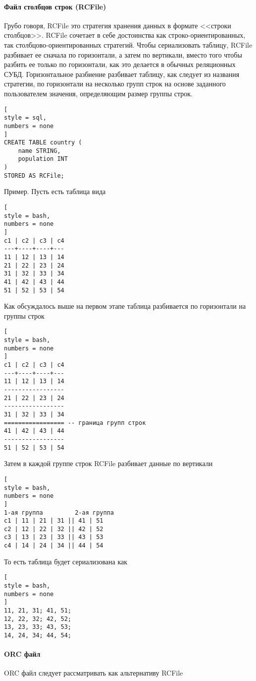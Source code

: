 \documentclass[%
	11pt,
	a4paper,
	utf8,
		]{article}
\begin{document}
\paragraph{Файл столбцов строк (RCFile)} Грубо говоря, RCFile это стратегия хранения данных в формате <<строки столбцов>>. RCFile сочетает в себе достоинства как строко-ориентированных, так столбцово-ориентированных стратегий. Чтобы сериализовать таблицу, RCFile разбивает ее сначала по горизонтали, а затем по вертикали, вместо того чтобы разбить ее только по горизонтали, как это делается в обычных реляционных СУБД. Горизонтальное разбиение разбивает таблицу, как следует из названия стратегии, по горизонтали на несколько групп строк на основе заданного пользователем значения, определяющим размер группы строк.
\begin{lstlisting}[
style = sql,
numbers = none	
]
CREATE TABLE country (
	name STRING,
	population INT
)
STORED AS RCFile;
\end{lstlisting}

Пример. Пусть есть таблица вида
\begin{lstlisting}[
style = bash,
numbers = none	
]
c1 | c2 | c3 | c4
---+----+----+---
11 | 12 | 13 | 14
21 | 22 | 23 | 24
31 | 32 | 33 | 34
41 | 42 | 43 | 44
51 | 52 | 53 | 54
\end{lstlisting}

Как обсуждалось выше на первом этапе таблица разбивается по горизонтали на группы строк
\begin{lstlisting}[
style = bash,
numbers = none	
]
c1 | c2 | c3 | c4
---+----+----+---
11 | 12 | 13 | 14
-----------------
21 | 22 | 23 | 24
-----------------
31 | 32 | 33 | 34
================= -- граница групп строк
41 | 42 | 43 | 44
-----------------
51 | 52 | 53 | 54
\end{lstlisting}

Затем в каждой группе строк RCFile разбивает данные по вертикали
\begin{lstlisting}[
style = bash,
numbers = none	
]
1-ая группа         2-ая группа
с1 | 11 | 21 | 31 || 41 | 51
c2 | 12 | 22 | 32 || 42 | 52
c3 | 13 | 23 | 33 || 43 | 53
c4 | 14 | 24 | 34 || 44 | 54
\end{lstlisting}

То есть таблица будет сериализована как
\begin{lstlisting}[
style = bash,
numbers = none	
]
11, 21, 31; 41, 51;
12, 22, 32; 42, 52;
13, 23, 33; 43, 53;
14, 24, 34; 44, 54;
\end{lstlisting}

\paragraph{ORC файл} ORC файл следует рассматривать как альтернативу RCFile
\end{document}
